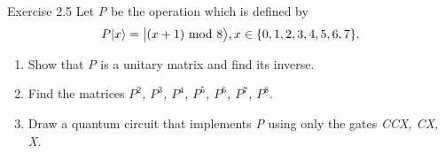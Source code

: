 \documentclass[letterpaper]{article}
\begin{document}
\begin{section}{Exercise 2.5}
Let \textit{P} be the operation which is defined by
\begin{equation*}
    P|x\rangle = \big|(x+1) \textnormal{ mod } 8\big\rangle, x \in \{0,1,2,3,4,5,6,7\}.
\end{equation*}
    \begin{enumerate}[label=(\emph{\alph*})]
        \item Show that \textit{P} is a unitary matrix and find its inverse.
        \item Find the matrices \textit{$P^2$, $P^3$, $P^4$, $P^5$, $P^6$, $P^7$, $P^8$}.
        \item Draw a quantum circuit that implements \textit{P} using only the gates \textit{CCX, CX, X.}
    \end{enumerate}
\end{section}
\end{document}
